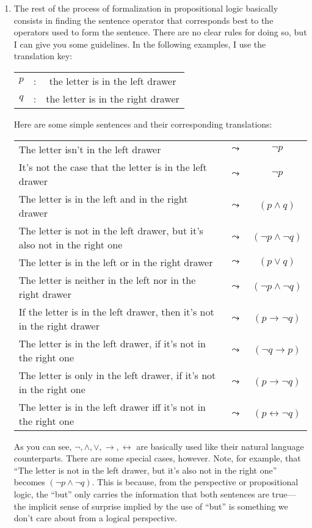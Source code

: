 \begin{enumerate}[\thesection.1]
\item The rest of the process of formalization in propositional logic basically consists in finding the sentence operator that corresponds best to the operators used to form the sentence. There are no clear rules for doing so, but I can give you some guidelines. In the following examples, I use the translation key:
	\begin{center}
	\begin{tabular}{c c c}
	$p$ & : & the letter is in the left drawer\\
	$q$ & : & the letter is in the right drawer
	\end{tabular}
	\end{center}
Here are some simple sentences and their corresponding translations:	\begin{longtable}{p{8cm} c c}
	The letter isn't in the left drawer & $\leadsto$ & $\neg p$\\[1ex]
	It's not the case that the letter is in the left drawer & $\leadsto$ & $\neg p$\\[1ex]
	The letter is in the left and in the right drawer & $\leadsto$ & $(p\land q)$\\[1ex]
	The letter is not in the left drawer, but it's also not in the right one & $\leadsto$ & $(\neg p\land \neg q)$\\[1ex]
	The letter is in the left or in the right drawer & $\leadsto$ & $(p\lor q)$\\[1ex]
	The letter is neither in the left nor in the right drawer  & $\leadsto$ & $(\neg p\land \neg q)$\\[1ex]
	If the letter is in the left drawer, then it's not in the right drawer & $\leadsto$ & $(p\to \neg q)$\\[1ex]
	The letter is in the left drawer, if it's not in the right one & $\leadsto$ & $(\neg q\to p)$\\[1ex]
	The letter is only in the left drawer, if it's not in the right one & $\leadsto$ & $(p\to \neg q)$\\[1ex]
	The letter is in the left drawer iff it's not in the right one & $\leadsto$ & $(p\leftrightarrow \neg q)$\\
	\end{longtable}
	As you can see, $\neg,\land,\lor,\to,\leftrightarrow$ are basically used like their natural language counterparts. There are some special cases, however. Note, for example, that ``The letter is not in the left drawer, but it's also not in the right one'' becomes $(\neg p\land \neg q)$. This is because, from the perspective or propositional logic, the ``but'' only carries the information that both sentences are true---the implicit sense of surprise implied by the use of ``but'' is something we don't care about from a logical perspective.
	

\end{enumerate}
